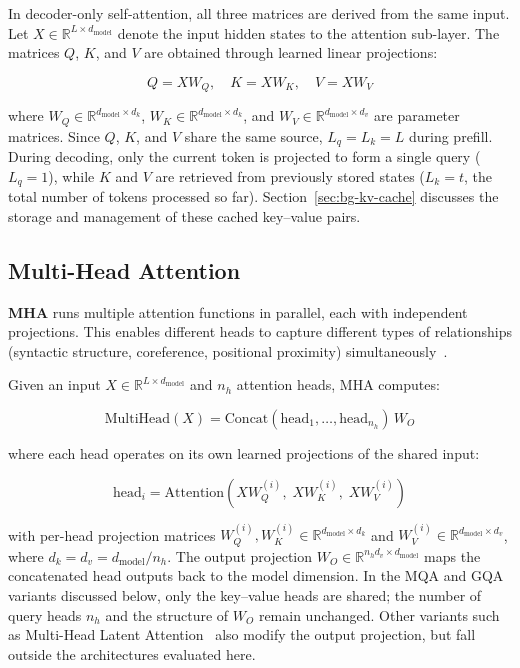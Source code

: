 \documentclass[
english,                 %
bibtex,                  %
]{kththesis}
\numberwithin{listing}{chapter}
\begin{document}
In decoder-only self-attention, all three matrices are derived from the same input. Let $X \in \mathbb{R}^{L \times d_{\text{model}}}$ denote the input hidden states to the attention sub-layer. The matrices $Q$, $K$, and $V$ are obtained through learned linear projections:

\begin{equation}
\label{eq:qkv-projection}
Q = X W_Q, \quad K = X W_K, \quad V = X W_V
\end{equation}

\noindent where $W_Q \in \mathbb{R}^{d_{\text{model}} \times d_k}$, $W_K \in \mathbb{R}^{d_{\text{model}} \times d_k}$, and $W_V \in \mathbb{R}^{d_{\text{model}} \times d_v}$ are parameter matrices. Since $Q$, $K$, and $V$ share the same source, $L_q = L_k = L$ during prefill. During decoding, only the current token is projected to form a single query ($L_q = 1$), while $K$ and $V$ are retrieved from previously stored states ($L_k = t$, the total number of tokens processed so far). Section~\ref{sec:bg-kv-cache} discusses the storage and management of these cached key--value pairs.

\subsection{Multi-Head Attention}
\label{sec:bg-mha}

\textbf{\gls{MHA}} runs multiple attention functions in parallel, each with independent projections. This enables different heads to capture different types of relationships (syntactic structure, coreference, positional proximity) simultaneously~\cite{vaswani2017attention}.

Given an input $X \in \mathbb{R}^{L \times d_{\text{model}}}$ and $n_h$ attention heads, MHA computes:

\begin{equation}
\label{eq:mha}
\text{MultiHead}(X) = \text{Concat}(\text{head}_1, \ldots, \text{head}_{n_h})\, W_O
\end{equation}

\noindent where each head operates on its own learned projections of the shared input:

\begin{equation}
\label{eq:mha-head}
\text{head}_i = \text{Attention}\!\left(X W_Q^{(i)},\; X W_K^{(i)},\; X W_V^{(i)}\right)
\end{equation}

\noindent with per-head projection matrices $W_Q^{(i)}, W_K^{(i)} \in \mathbb{R}^{d_{\text{model}} \times d_k}$ and $W_V^{(i)} \in \mathbb{R}^{d_{\text{model}} \times d_v}$, where $d_k = d_v = d_{\text{model}} / n_h$. The output projection $W_O \in \mathbb{R}^{n_h d_v \times d_{\text{model}}}$ maps the concatenated head outputs back to the model dimension. In the MQA and GQA variants discussed below, only the key--value heads are shared; the number of query heads $n_h$ and the structure of $W_O$ remain unchanged. Other variants such as Multi-Head Latent Attention~\cite{deepseekv2} also modify the output projection, but fall outside the architectures evaluated here.
\end{document}
